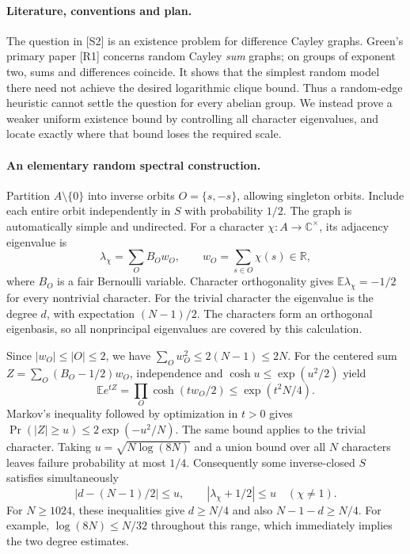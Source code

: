 \documentclass[11pt,a4paper]{article}
\begin{document}
\paragraph{Literature, conventions and plan.}
The question in [S2] is an existence problem for difference Cayley graphs.
Green's primary paper [R1] concerns random Cayley \emph{sum} graphs;
on groups of exponent two, sums and differences coincide. It shows
that the simplest random model there need not achieve the desired
logarithmic clique bound. Thus a random-edge heuristic cannot settle
the question for every abelian group. We instead prove a weaker uniform
existence bound by controlling all character eigenvalues, and locate
exactly where that bound loses the required scale.

\paragraph{An elementary random spectral construction.}
Partition $A\setminus\{0\}$ into inverse orbits $O=\{s,-s\}$, allowing
singleton orbits. Include each entire orbit independently in $S$ with
probability $1/2$. The graph is automatically simple and undirected.
For a character $\chi:A\to\mathbb C^\times$, its adjacency eigenvalue is
\[
 \lambda_\chi=\sum_O B_Ow_O,\qquad
 w_O=\sum_{s\in O}\chi(s)\in\mathbb R,
\]
where $B_O$ is a fair Bernoulli variable. Character orthogonality gives
$\mathbb E\lambda_\chi=-1/2$ for every nontrivial character. For the
trivial character the eigenvalue is the degree $d$, with expectation
$(N-1)/2$. The characters form an orthogonal eigenbasis, so all
nonprincipal eigenvalues are covered by this calculation.

Since $|w_O|\le|O|\le2$, we have $\sum_Ow_O^2\le2(N-1)\le2N$.
For the centered sum $Z=\sum_O(B_O-1/2)w_O$, independence and
$\cosh u\le\exp(u^2/2)$ yield
\[
 \mathbb E e^{tZ}=\prod_O\cosh(tw_O/2)
 \le\exp(t^2N/4).
\]
Markov's inequality followed by optimization in $t>0$ gives
$\Pr(|Z|\ge u)\le2\exp(-u^2/N)$. The same bound applies to the
trivial character. Taking $u=\sqrt{N\log(8N)}$ and a union bound over
all $N$ characters leaves failure probability at most $1/4$.
Consequently some inverse-closed $S$ satisfies simultaneously
\[
 |d-(N-1)/2|\le u,\qquad
 |\lambda_\chi+1/2|\le u\quad(\chi\ne1).
\]
For $N\ge1024$, these inequalities give $d\ge N/4$ and also
$N-1-d\ge N/4$. For example, $\log(8N)\le N/32$ throughout this
range, which immediately implies the two degree estimates.
\end{document}

